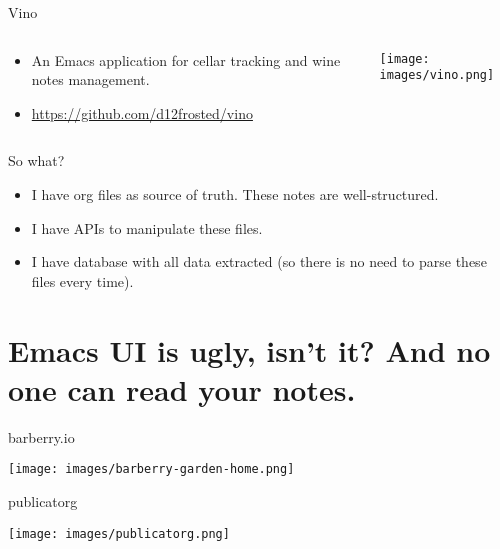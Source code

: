 \documentclass[presentation,aspectratio=169,smaller]{beamer}
\begin{document}
\begin{frame}[label={sec:orgb1d3991}]{Vino}
\begin{columns}
\begin{column}{0.75\columnwidth}
\begin{itemize}
\item An Emacs application for cellar tracking and wine notes management.
\item \url{https://github.com/d12frosted/vino}
\end{itemize}
\end{column}

\begin{column}{0.25\columnwidth}
\begin{center}
\texttt{[image: images/vino.png]}
\end{center}
\end{column}
\end{columns}
\end{frame}

\begin{frame}[label={sec:org57fa62c}]{So what?}
\begin{itemize}
\item I have org files as source of truth. These notes are \alert{well-structured}.
\item I have APIs to manipulate these files.
\item I have database with all data extracted (so there is no need to parse these files every time).
\end{itemize}
\end{frame}

\section{Emacs UI is ugly, isn't it? And no one can read your notes.}
\label{sec:orgcef766d}

\begin{frame}[label={sec:org9132fa5}]{barberry.io}
\begin{center}
\texttt{[image: images/barberry-garden-home.png]}
\end{center}
\end{frame}

\begin{frame}[label={sec:org1fe83b8}]{publicatorg}
\begin{center}
\texttt{[image: images/publicatorg.png]}
\end{center}
\end{frame}
\end{document}

